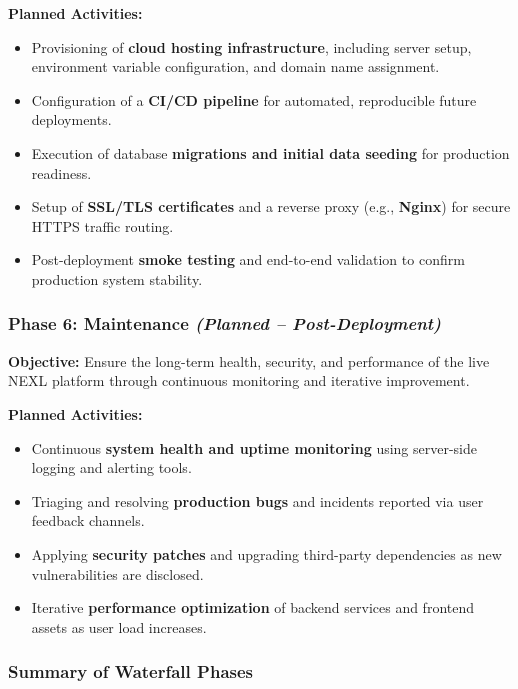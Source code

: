 \textbf{Planned Activities:}
\begin{itemize}
    \item Provisioning of \textbf{cloud hosting infrastructure}, including server setup, environment variable configuration, and domain name assignment.
    \item Configuration of a \textbf{CI/CD pipeline} for automated, reproducible future deployments.
    \item Execution of database \textbf{migrations and initial data seeding} for production readiness.
    \item Setup of \textbf{SSL/TLS certificates} and a reverse proxy (e.g., \textbf{Nginx}) for secure HTTPS traffic routing.
    \item Post-deployment \textbf{smoke testing} and end-to-end validation to confirm production system stability.
\end{itemize}

\subsubsection*{Phase 6: Maintenance \hfill \textit{(Planned -- Post-Deployment)}}

\textbf{Objective:} Ensure the long-term health, security, and performance of the live NEXL platform through continuous monitoring and iterative improvement.

\textbf{Planned Activities:}
\begin{itemize}
    \item Continuous \textbf{system health and uptime monitoring} using server-side logging and alerting tools.
    \item Triaging and resolving \textbf{production bugs} and incidents reported via user feedback channels.
    \item Applying \textbf{security patches} and upgrading third-party dependencies as new vulnerabilities are disclosed.
    \item Iterative \textbf{performance optimization} of backend services and frontend assets as user load increases.
\end{itemize}

\subsubsection*{Summary of Waterfall Phases}

